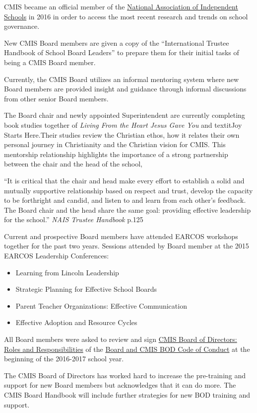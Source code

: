 \begin{findings}
CMIS became an official member of the \href{http://www.nais.org/Articles/Pages/NAIS-Trustee-Handbook-Resources.aspx}{National Association of Independent Schools} in 2016 in order to access the most recent research and trends on school governance. 

New CMIS Board members are given a copy of the “International Trustee Handbook of School Board Leaders” to prepare them for their initial tasks of being a CMIS Board member. 

Currently, the CMIS Board utilizes an informal mentoring system where new Board members are provided insight and guidance through informal discussions from other senior Board members. 

The Board chair and newly appointed Superintendent are currently completing book studies together of \textit{Living From the Heart Jesus Gave You} and textit{Joy Starts Here}.Their studies review the Christian ethos, how it relates their own personal journey in Christianity and the Christian vision for CMIS. This mentorship relationship highlights the importance of a strong partnership between the chair and the head of the school,

``It is critical that the chair and head make every effort to establish a solid and mutually supportive relationship based on respect and trust, develop the capacity to be forthright and candid, and listen to and learn from each other's feedback. The Board chair and the head share the same goal: providing effective leadership for the school.'' \textit{NAIS Trustee Handbook} p.125

Current and prospective Board members have attended EARCOS workshops together for the past two years. Sessions attended by Board member at the 2015 EARCOS Leadership Conferences:
\begin{itemize}
\item Learning from Lincoln Leadership
\item Strategic Planning for Effective School Boards 
\item Parent Teacher Organizations: Effective Communication
\item Effective Adoption and Resource Cycles 
\end{itemize}

All Board members were asked to review and sign \href{https://docs.google.com/a/cmis.ac.th/document/d/1sVjFjeVtwbk0-n8GsM5K_XzZSn2wejtlJ3kurXUrKGU/edit?usp=sharing}{CMIS Board of Directors: Roles and Responsibilities} of the \href{https://docs.google.com/a/cmis.ac.th/document/d/1sVjFjeVtwbk0-n8GsM5K_XzZSn2wejtlJ3kurXUrKGU/edit?usp=sharing}{Board and CMIS BOD Code of Conduct} at the beginning of the 2016-2017 school year.


The CMIS Board of Directors has worked hard to increase the pre-training and support for new Board members but acknowledges that it can do more. The CMIS Board Handbook will include further strategies for new BOD training and support.
\end{findings}

